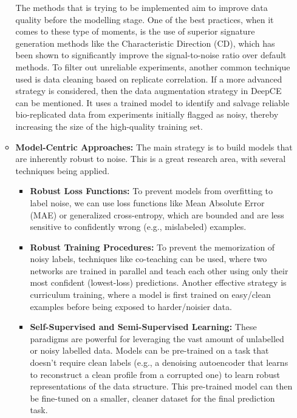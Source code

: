 \documentclass[twocolumn]{article}
\begin{document}
\begin{itemize}
\begin{itemize}
            The methods that is trying to be implemented aim to improve data quality before the modelling stage. One of the best practices, when it comes to these type of moments, is the use of superior signature generation methods like the Characteristic Direction (CD), which has been shown to significantly improve the signal-to-noise ratio over default methods\cite{duan2016l1000cds2}. To filter out unreliable experiments, another common technique used is data cleaning based on replicate correlation\cite{szalai2019signatures}. If a more advanced strategy is considered, then the data augmentation strategy in DeepCE can be mentioned. It uses a trained model to identify and salvage reliable bio-replicated data from experiments initially flagged as noisy, thereby increasing the size of the high-quality training set\cite{pham2021deep}.
                \\
            \item \textbf{Model-Centric Approaches:} 
            The main strategy is to build models that are inherently robust to noise. This is a great research area, with several techniques being applied. 
            \begin{itemize}
            \item \textbf{Robust Loss Functions:} To prevent models from overfitting to label noise, we can use loss functions like Mean Absolute Error (MAE) or generalized cross-entropy, which are bounded and are less sensitive to confidently wrong (e.g., mislabeled) examples\cite{szalai2019signatures}.
            \item \textbf{Robust Training Procedures:} To prevent the memorization of noisy labels, techniques like co-teaching can be used, where two networks are trained in parallel and teach each other using only their most confident (lowest-loss) predictions\cite{szalai2019signatures}. Another effective strategy is curriculum training, where a model is first trained on easy/clean examples before being exposed to harder/noisier data\cite{pham2021deep}.
            \item \textbf{Self-Supervised and Semi-Supervised Learning:} These paradigms are powerful for leveraging the vast amount of unlabelled or noisy labelled data. Models can be pre-trained on a task that doesn't require clean labels (e.g., a denoising autoencoder that learns to reconstruct a clean profile from a corrupted one) to learn robust representations of the data structure. This pre-trained model can then be fine-tuned on a smaller, cleaner dataset for the final prediction task\cite{bang2024transfer}.
    \end{itemize}
  \end{itemize}
\end{itemize}
\end{document}
